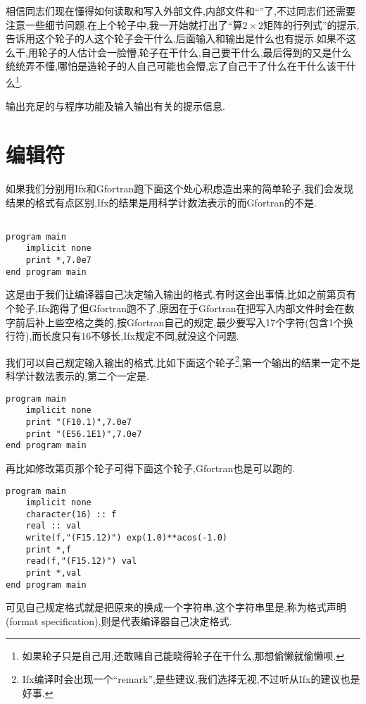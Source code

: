 相信同志们现在懂得如何读取和写入外部文件,内部文件和``\ttt{*}''了,不过同志们还需要注意一些细节问题.在上个轮子中,我一开始就打出了``算$2\times2$矩阵的行列式''的提示,告诉用这个轮子的人这个轮子会干什么,后面输入和输出是什么也有提示.如果不这么干,用轮子的人估计会一脸懵,轮子在干什么,自己要干什么,最后得到的又是什么统统弄不懂,哪怕是造轮子的人自己可能也会懵,忘了自己干了什么在干什么该干什么\footnote{如果轮子只是自己用,还敢赌自己能晓得轮子在干什么,那想偷懒就偷懒呗.}.

\begin{convention}
    输出充足的与程序功能及输入输出有关的提示信息.
\end{convention}

\section{编辑符}\label{fortran_edit_descriptor}

如果我们分别用Ifx和Gfortran跑下面这个处心积虑造出来的简单轮子,我们会发现结果的格式有点区别,Ifx的结果是用科学计数法表示的而Gfortran的不是.
\begin{lstlisting}

program main
    implicit none
    print *,7.0e7
end program main
\end{lstlisting}
这是由于我们让编译器自己决定输入输出的格式,有时这会出事情,比如之前第\pageref{internal_file}页有个轮子,Ifx跑得了但Gfortran跑不了,原因在于Gfortran在把写入内部文件时会在数字前后补上些空格之类的,按Gfortran自己的规定,最少要写入17个字符(包含1个换行符),而长度只有16不够长,Ifx规定不同,就没这个问题.

我们可以自己规定输入输出的格式,比如下面这个轮子\footnote{Ifx编译时会出现一个``remark'',是些建议,我们选择无视,不过听从Ifx的建议也是好事.},第一个输出的结果一定不是科学计数法表示的,第二个一定是.
\begin{lstlisting}
program main
    implicit none
    print "(F10.1)",7.0e7
    print "(ES6.1E1)",7.0e7
end program main
\end{lstlisting}
再比如修改第\pageref{internal_file}页那个轮子可得下面这个轮子,Gfortran也是可以跑的.
\begin{lstlisting}
program main
    implicit none
    character(16) :: f
    real :: val
    write(f,"(F15.12)") exp(1.0)**acos(-1.0)
    print *,f
    read(f,"(F15.12)") val
    print *,val
end program main
\end{lstlisting}
可见自己规定格式就是把原来的\ttt{*}换成一个字符串,这个字符串里是,称为格式声明(format specification),\ttt{*}则是代表编译器自己决定格式.

